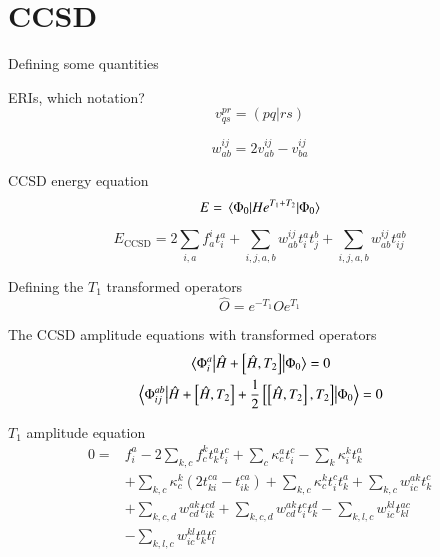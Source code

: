 \documentclass[aip,jcp,reprint,amsmath,amssymb,floatfix,citeautoscript,nofootinbib,onecolumn]{revtex4-2}
\begin{document}
\section{CCSD}

Defining some quantities

ERIs, which notation?
\begin{equation}
    v^{pr}_{qs}=\left(pq|rs\right)
\end{equation}

\begin{equation}
    w^{ij}_{ab}=2v^{ij}_{ab}-v^{ij}_{ba}
\end{equation}

CCSD energy equation
\begin{equation}
    E=\ev{He^{T_1+T_2}}{\Phi_0}
\end{equation}

\begin{equation}
    E_\mathrm{CCSD} = 2\sum_{i,a}f^i_at^a_i+\sum_{i,j,a,b}w^{ij}_{ab}t^a_it^b_j+\sum_{i,j,a,b}w^{ij}_{ab}t^{ab}_{ij}
\end{equation}

Defining the $T_1$ transformed operators
\begin{equation}
    \hat{O}=e^{-T_1}Oe^{T_1}
\end{equation}

The CCSD amplitude equations with transformed operators
\begin{gather}
    \mel{\Phi^a_i}{\hat{H}+\left[\hat{H},T_2\right]}{\Phi_0}=0\\
    \mel{\Phi^{ab}_{ij}}{\hat{H}+\left[\hat{H},T_2\right]+\frac{1}{2}\left[\left[\hat{H},T_2\right],T_2\right]}{\Phi_0}=0
\end{gather}

$T_1$ amplitude equation
\begin{equation}
    \begin{aligned}
        0=&f^a_i-2\sum_{k,c}f^k_ct^a_kt^c_i+\sum_c\kappa^a_ct^c_i-\sum_k\kappa^k_it^a_k\\
        &+\sum_{k,c}\kappa^k_c\left(2t^{ca}_{ki}-t^{ca}_{ik}\right)+\sum_{k,c}\kappa^k_ct^c_it^a_k+\sum_{k,c}w^{ak}_{ic}t^c_k\\
        &+\sum_{k,c,d}w^{ak}_{cd}t^{cd}_{ik}+\sum_{k,c,d}w^{ak}_{cd}t^c_it^d_k-\sum_{k,l,c}w^{kl}_{ic}t^{ac}_{kl}\\
        &-\sum_{k,l,c}w^{kl}_{ic}t^a_kt^c_l
    \end{aligned}
\end{equation}
\end{document}
